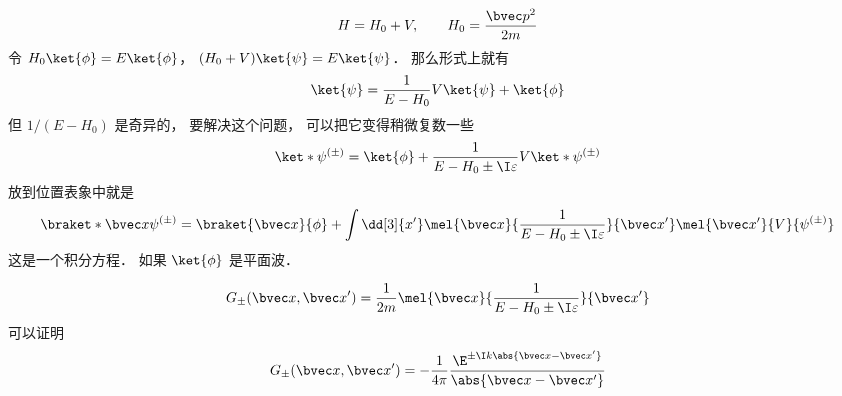 
\begin{equation}
H = H_0 + V, \qquad H_0 = \frac{\bvec p^2}{2m}
\end{equation}
令 $H_0\ket{\phi} = E\ket{\phi}$， $(H_0+V)\ket{\psi}=E\ket{\psi}$． 那么形式上就有
\begin{equation}
\ket{\psi} = \frac{1}{E-H_0} V\ket{\psi} + \ket{\phi}
\end{equation}
但 $1/(E-H_0)$ 是奇异的， 要解决这个问题， 可以把它变得稍微复数一些
\begin{equation}
\ket*{\psi^{(\pm)}} = \ket{\phi} + \frac{1}{E-H_0\pm \I\varepsilon} V \ket*{\psi^{(\pm)}}
\end{equation}
放到位置表象中就是
\begin{equation}
\braket*{\bvec x}{\psi^{(\pm)}} = \braket{\bvec x}{\phi} + \int \dd[3]{x'} \mel{\bvec x}{\frac{1}{E-H_0\pm \I\varepsilon}}{\bvec x'} \mel{\bvec x'}{V}{\psi^{(\pm)}}
\end{equation}
这是一个积分方程． 如果 $\ket{\phi}$ 是平面波．

\begin{equation}
G_\pm (\bvec x, \bvec x') = \frac{1}{2m} \mel{\bvec x}{\frac{1}{E-H_0\pm \I\varepsilon}}{\bvec x'}
\end{equation}
可以证明
\begin{equation}
G_\pm (\bvec x, \bvec x') = -\frac{1}{4\pi} \frac{\E^{\pm\I k\abs{\bvec x-\bvec x'}}}{\abs{\bvec x-\bvec x'}}
\end{equation}

